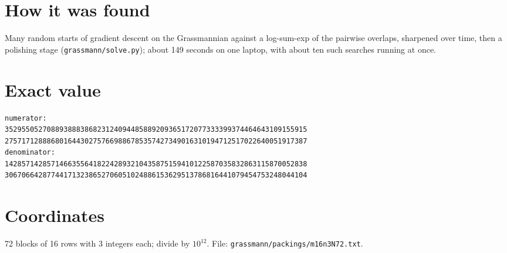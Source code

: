 \documentclass[11pt,a4paper]{article}
\begin{document}
\section{How it was found}
Many random starts of gradient descent on the Grassmannian against a log-sum-exp of the pairwise overlaps, sharpened over time, then a polishing stage (\texttt{grassmann/solve.py}); about 149 seconds on one laptop, with about ten such searches running at once.


\appendix
\section{Exact value}
{\small
\begin{verbatim}
numerator:
352955052708893888386823124094485889209365172077333399374464643109155915
275717128886801644302757669886785357427349016310194712517022640051917387
denominator:
142857142857146635564182242893210435875159410122587035832863115870052838
306706642877441713238652706051024886153629513786816441079454753248044104
\end{verbatim}}

\section{Coordinates}
72 blocks of 16 rows with 3 integers each; divide by $10^{12}$. File: \texttt{grassmann/packings/m16n3N72.txt}.
{\tiny
\begin{multicols}{3}
\end{multicols}}
\end{document}
